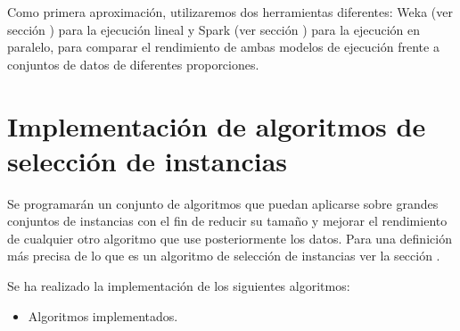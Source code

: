 Como primera aproximación, utilizaremos dos herramientas diferentes: Weka (ver sección ) para la ejecución lineal y Spark (ver sección ) para la ejecución en paralelo, para comparar el rendimiento de ambas modelos de ejecución frente a conjuntos de datos de diferentes proporciones.


\section{Implementación de algoritmos de selección de instancias}

Se programarán un conjunto de algoritmos que puedan aplicarse sobre grandes conjuntos de instancias con el fin de reducir su tamaño y mejorar el rendimiento de cualquier otro algoritmo que use posteriormente los datos. Para una definición más precisa de lo que es un algoritmo de selección de instancias ver la sección .

Se ha realizado la implementación de los siguientes algoritmos:

\begin{itemize}
	\item Algoritmos implementados.
\end{itemize}


